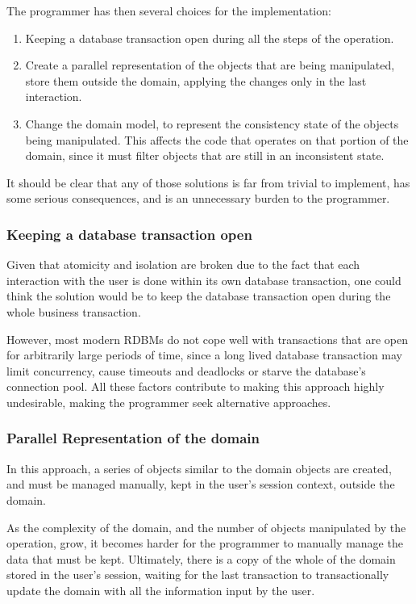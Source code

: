 \documentclass{llncs}
\begin{document}
The programmer has then several choices for the implementation:

\begin{enumerate}
\item Keeping a database transaction open during all the steps of the
  operation.

\item Create a parallel representation of the objects that are being
  manipulated, store them outside the domain, applying the changes
  only in the last interaction.

\item Change the domain model, to represent the consistency state of
  the objects being manipulated. This affects the code that operates
  on that portion of the domain, since it must filter objects that are
  still in an inconsistent state.
\end{enumerate}

It should be clear that any of those solutions is far from trivial to
implement, has some serious consequences, and is an unnecessary burden
to the programmer.

\subsubsection{Keeping a database transaction open}

Given that atomicity and isolation are broken due to the fact that
each interaction with the user is done within its own database
transaction, one could think the solution would be to keep the
database transaction open during the whole business transaction.

However, most modern RDBMs do not cope well with transactions that are
open for arbitrarily large periods of time, since a long lived
database transaction may limit concurrency, cause timeouts and
deadlocks or starve the database's connection pool. All these factors
contribute to making this approach highly undesirable, making the
programmer seek alternative approaches.

\subsubsection{Parallel Representation of the domain}

In this approach, a series of objects similar to the domain objects
are created, and must be managed manually, kept in the user's session
context, outside the domain.

As the complexity of the domain, and the number of objects manipulated
by the operation, grow, it becomes harder for the programmer to
manually manage the data that must be kept. Ultimately, there is a
copy of the whole of the domain stored in the user's session, waiting
for the last transaction to transactionally update the domain with all
the information input by the user.
\end{document}
